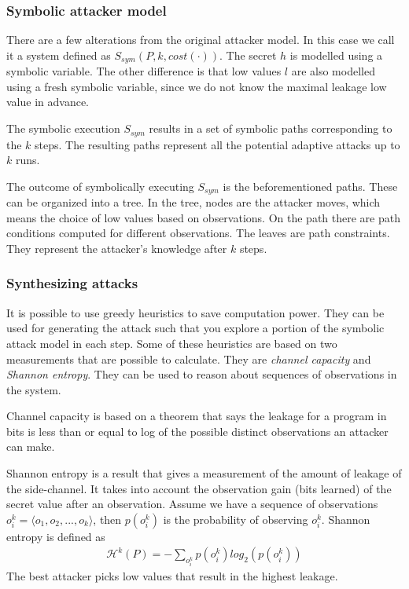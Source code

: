 \documentclass[11pt,a4paper,notitlepage]{article}
\begin{document}
\subsubsection{Symbolic attacker model}
There are a few alterations from the original attacker model. In this case we call it a system defined as $S_{sym}(P,k,cost(\cdot))$. The secret $h$ is modelled using a symbolic variable. The other difference is that low values $l$ are also modelled using a fresh symbolic variable, since we do not know the maximal leakage low value in advance.

The symbolic execution $S_{sym}$ results in a set of symbolic paths corresponding to the $k$ steps. The resulting paths represent all the potential adaptive attacks up to $k$ runs. 

The outcome of symbolically executing $S_{sym}$ is the beforementioned paths. These can be organized into a tree. In the tree, nodes are the attacker moves, which means the choice of low values based on observations. On the path there are path conditions computed for different observations. The leaves are path constraints. They represent the attacker's knowledge after $k$ steps. 

\subsubsection{Synthesizing attacks}
It is possible to use greedy heuristics to save computation power. They can be used for generating the attack such that you explore a portion of the symbolic attack model in each step. Some of these heuristics are based on two measurements that are possible to calculate. They are \textit{channel capacity} and \textit{Shannon entropy}. They can be used to reason about sequences of observations in the system. 

Channel capacity \cite{smithQIF} is based on a theorem that says the leakage for a program in bits is less than or equal to log of the possible distinct observations an attacker can make. 

Shannon entropy is a result that gives a measurement of the amount of leakage of the side-channel. It takes into account the observation gain (bits learned) of the secret value after an observation. Assume we have a sequence of observations $o_i^k = \langle o_1,o_2,...,o_k \rangle$, then $p(o_i^k)$ is the probability of observing $o_i^k$. Shannon entropy is defined as 
\begin{align*}
    \mathcal{H}^k(P) = -\sum_{o_i^k} p(o_i^k) log_2(p(o_i^k))
\end{align*}
The best attacker picks low values that result in the highest leakage.
\end{document}
